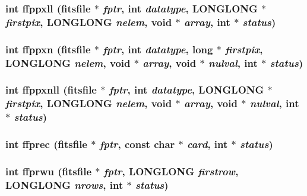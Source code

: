 \subsubsection{\setlength{\rightskip}{0pt plus 5cm}int ffppxll (\bf{fitsfile} $\ast$ {\em fptr}, int {\em datatype}, \bf{LONGLONG} $\ast$ {\em firstpix}, \bf{LONGLONG} {\em nelem}, void $\ast$ {\em array}, int $\ast$ {\em status})}\label{src_2fitsio_8h_a5a52d455af81ac3c3ea32e15ce790fe}


\subsubsection{\setlength{\rightskip}{0pt plus 5cm}int ffppxn (\bf{fitsfile} $\ast$ {\em fptr}, int {\em datatype}, long $\ast$ {\em firstpix}, \bf{LONGLONG} {\em nelem}, void $\ast$ {\em array}, void $\ast$ {\em nulval}, int $\ast$ {\em status})}\label{src_2fitsio_8h_2ff55dfbe37f1ecf48227480629dc956}


\subsubsection{\setlength{\rightskip}{0pt plus 5cm}int ffppxnll (\bf{fitsfile} $\ast$ {\em fptr}, int {\em datatype}, \bf{LONGLONG} $\ast$ {\em firstpix}, \bf{LONGLONG} {\em nelem}, void $\ast$ {\em array}, void $\ast$ {\em nulval}, int $\ast$ {\em status})}\label{src_2fitsio_8h_a46e0229ce53eaeb3e024daff7cda152}


\subsubsection{\setlength{\rightskip}{0pt plus 5cm}int ffprec (\bf{fitsfile} $\ast$ {\em fptr}, const char $\ast$ {\em card}, int $\ast$ {\em status})}\label{src_2fitsio_8h_b8a4ffee9072c15ac03cdb0c28a50730}


\subsubsection{\setlength{\rightskip}{0pt plus 5cm}int ffprwu (\bf{fitsfile} $\ast$ {\em fptr}, \bf{LONGLONG} {\em firstrow}, \bf{LONGLONG} {\em nrows}, int $\ast$ {\em status})}\label{src_2fitsio_8h_a9ad4a1b317ff4337067d66288c9a245}


